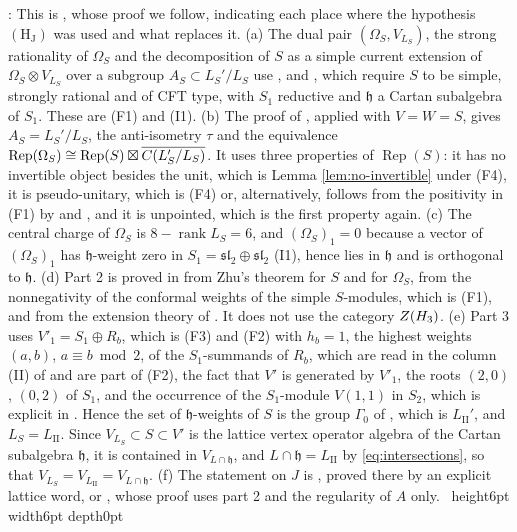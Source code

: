 \documentclass[leqno]{article}
\let\cal\relax
\newcommand{\cal}{\mathcal}
\newcommand{\qed}{\hfill \vrule height6pt  width6pt depth0pt}
\newcommand{\ot}{\otimes}
\newcommand{\ovl}{\overline}
\DeclareMathOperator{\Rep}{Rep}
\newenvironment{proof}[1][]{\noindent {\it Proof #1} : }{\hbox{~}\qed
\smallskip
}
\numberwithin{equation}{section}
\begin{document}
\begin{proof}
This is \cite[Proposition 12.2]{Arh26}, whose proof we follow, indicating each place where the hypothesis $\mathrm{(H_J)}$ was used and what replaces it. (a) The dual pair $(\Omega_S, V_{L_S})$, the strong rationality of $\Omega_S$ and the decomposition of $S$ as a simple current extension of $\Omega_S \ot V_{L_S}$ over a subgroup $A_S \subset L_S'/L_S$ use \cite[Definition 2.12 and Proposition 2.14]{MoR24a}, \cite[Theorem 1]{Mas14} and \cite{CKLR19}, which require $S$ to be simple, strongly rational and of CFT type, with $S_1$ reductive and $\mathfrak h$ a Cartan subalgebra of $S_1$. These are (F1) and (I1). (b) The proof of \cite[Corollary 4.10]{MoR24a}, applied with $V = W = S$, gives $A_S = L_S'/L_S$, the anti-isometry $\tau$ and the equivalence $\Rep(\Omega_S) \cong \Rep(S) \boxtimes \ovl{\cal C(L_S'/L_S)}$. It uses three properties of $\Rep(S)$: it has no invertible object besides the unit, which is Lemma \ref{lem:no-invertible} under (F4), it is pseudo-unitary, which is (F4) or, alternatively, follows from the positivity in (F1) by \cite[Lemma 4.2]{DJX13} and \cite{Hua08}, and it is unpointed, which is the first property again. (c) The central charge of $\Omega_S$ is $8-\operatorname{rank}L_S = 6$, and $(\Omega_S)_1 = 0$ because a vector of $(\Omega_S)_1$ has $\mathfrak h$-weight zero in $S_1 = \mathfrak{sl}_2 \oplus \mathfrak{sl}_2$ (I1), hence lies in $\mathfrak h$ and is orthogonal to $\mathfrak h$. (d) Part 2 is proved in \cite{Arh26} from Zhu's theorem for $S$ and for $\Omega_S$, from the nonnegativity of the conformal weights of the simple $S$-modules, which is (F1), and from the extension theory of \cite{HKL15,CKM22}. It does not use the category $Z(\cal H_3)$. (e) Part 3 uses $V'_1 = S_1 \oplus R_b$, which is (F3) and (F2) with $h_b = 1$, the highest weights $(a,b)$, $a \equiv b \bmod 2$, of the $S_1$-summands of $R_b$, which are read in the column (II) of \cite[Table 2]{Arh26} and are part of (F2), the fact that $V'$ is generated by $V'_1$, the roots $(2,0)$, $(0,2)$ of $S_1$, and the occurrence of the $S_1$-module $V(1,1)$ in $S_2$, which is explicit in \cite[Section 10]{Arh26}. Hence the set of $\mathfrak h$-weights of $S$ is the group $\Gamma_0$ of \cite[Proposition 12.2]{Arh26}, which is $L_{\mathrm{II}}'$, and $L_S = L_{\mathrm{II}}$. Since $V_{L_S} \subset S \subset V'$ is the lattice vertex operator algebra of the Cartan subalgebra $\mathfrak h$, it is contained in $V_{L \cap \mathfrak h}$, and $L \cap \mathfrak h = L_{\mathrm{II}}$ by \eqref{eq:intersections}, so that $V_{L_S} = V_{L_{\mathrm{II}}} = V_{L \cap \mathfrak h}$. (f) The statement on $J$ is \cite[Proposition 11.4]{Arh26}, proved there by an explicit lattice word, or \cite[Proposition 12.2(4)]{Arh26}, whose proof uses part 2 and the regularity of $A$ only.
\end{proof}
\end{document}
